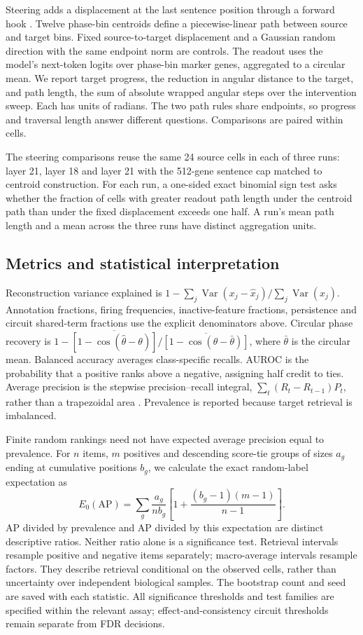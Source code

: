 \documentclass[review,authoryear,12pt]{elsarticle}
\begin{document}
Steering adds a displacement at the last sentence position through a forward hook
\citep{ref48,ref49}. Twelve phase-bin centroids define a piecewise-linear path between source
and target bins. Fixed source-to-target displacement and a Gaussian random direction with the
same endpoint norm are controls. The readout uses the model's next-token logits over phase-bin
marker genes, aggregated to a circular mean. We report target progress, the reduction in angular
distance to the target, and path length, the sum of absolute wrapped angular steps over the
intervention sweep. Each has units of radians. The two path rules share endpoints, so progress
and traversal length answer different questions. Comparisons are paired within cells.

The steering comparisons reuse the same 24 source cells in each of three runs: layer 21, layer 18
and layer 21 with the 512-gene sentence cap matched to centroid construction. For each run,
a one-sided exact binomial sign test asks whether the fraction of cells with greater
readout path length under the centroid path than under the fixed displacement exceeds one half.
A run's mean path length and a mean across the three runs have distinct aggregation units.

\subsection{Metrics and statistical interpretation}

Reconstruction variance explained is
$1-\sum_j\operatorname{Var}(x_j-\hat x_j)/\sum_j\operatorname{Var}(x_j)$.
Annotation fractions, firing frequencies, inactive-feature fractions, persistence and circuit
shared-term fractions use the explicit denominators above. Circular phase recovery is
$1-\overline{[1-\cos(\hat\theta-\theta)]}/
\overline{[1-\cos(\theta-\bar\theta)]}$, where $\bar\theta$ is the circular mean.
Balanced accuracy averages class-specific recalls. AUROC is the probability that a positive ranks
above a negative, assigning half credit to ties. Average precision is the stepwise precision--recall
integral, $\sum_t(R_t-R_{t-1})P_t$, rather than a trapezoidal area
\citep{refPRAUC}. Prevalence is reported because target retrieval is imbalanced.

Finite random rankings need not have expected average precision equal to prevalence. For $n$ items,
$m$ positives and descending score-tie groups of sizes $a_g$ ending at cumulative positions $b_g$,
we calculate the exact random-label expectation as
\[
E_0(\mathrm{AP})=\sum_g\frac{a_g}{n b_g}
\left[1+\frac{(b_g-1)(m-1)}{n-1}\right].
\]
AP divided by prevalence and AP divided by this expectation are distinct descriptive ratios.
Neither ratio alone is a significance test. Retrieval intervals resample positive and negative
items separately; macro-average intervals resample factors. They describe retrieval conditional
on the observed cells, rather than uncertainty over independent biological samples. The bootstrap
count and seed are saved with each statistic. All significance thresholds and test families are
specified within the relevant assay; effect-and-consistency circuit thresholds remain separate
from FDR decisions.
\end{document}
